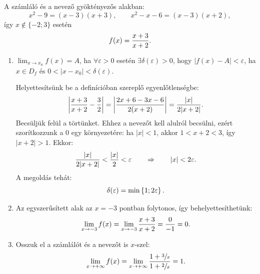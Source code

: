 \documentclass[11pt]{scrartcl}
\begin{document}
A számláló és a nevező gyöktényezős alakban:
\[
	x^2 - 9 = (x - 3)(x + 3),
	\qquad
	x^2 - x - 6 = (x - 3)(x + 2),
\]
így $x \notin \{-2; 3\}$ esetén
\[
	f(x) = \frac{x + 3}{x + 2}
	\text.
\]
\begin{enumerate}
	\item $\displaystyle\lim_{x \to x_0} f(x) = A$, ha
	      $\forall \varepsilon > 0$ esetén $\exists \delta(\varepsilon) > 0$,
	      hogy $|f(x) - A| < \varepsilon$, ha $x \in D_f$ és
	      $0 < |x - x_0| < \delta(\varepsilon)$.

	      Helyettesítsünk be a definícióban szereplő egyenlőtlenségbe:
	      \[
		      \left| \frac{x + 3}{x + 2} - \frac{3}{2} \right|
		      = \left| \frac{2x + 6 - 3x - 6}{2 (x + 2)} \right|
		      = \frac{|x|}{2 |x + 2|}
		      \text.
	      \]
	      Becsüljük felül a törtünket. Ehhez a nevezőt kell alulról becsülni,
	      ezért szorítkozzunk a $0$ egy környezetére: ha $|x| < 1$, akkor
	      $1 < x + 2 < 3$, így $|x + 2| > 1$. Ekkor:
	      \[
		      \frac{|x|}{2 |x + 2|}
		      < \frac{|x|}{2}
		      < \varepsilon
		      \qquad \Rightarrow \qquad
		      |x| < 2 \varepsilon
		      \text.
	      \]
	      A megoldás tehát:
	      \[
		      \delta(\varepsilon) = \min \left\{ 1; 2 \varepsilon \right\}
		      \text.
	      \]

	\item Az egyszerűsített alak az $x = -3$ pontban folytonos, így
	      behelyettesíthetünk:
	      \[
		      \lim_{x \to -3} f(x)
		      = \lim_{x \to -3} \frac{x + 3}{x + 2}
		      = \frac{0}{-1}
		      = 0
		      \text.
	      \]

	\item Osszuk el a számlálót és a nevezőt is $x$-szel:
	      \[
		      \lim_{x \to +\infty} f(x)
		      = \lim_{x \to +\infty} \frac{1 + \sfrac{3}{x}}{1 + \sfrac{2}{x}}
		      = 1
		      \text.
	      \]
\end{enumerate}
\end{document}
